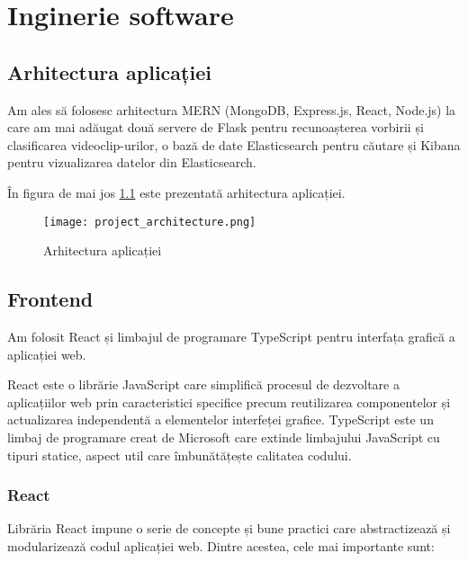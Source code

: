 \chapter{Inginerie software}

\section{Arhitectura aplicației}
Am ales să folosesc arhitectura MERN (MongoDB, Express.js, React, Node.js) la care am mai adăugat
două servere de Flask pentru recunoașterea vorbirii și clasificarea videoclip-urilor, o bază de
date Elasticsearch pentru căutare și Kibana pentru vizualizarea datelor din Elasticsearch.
\par
În figura de mai jos \ref{fig:project-architecture} este prezentată arhitectura aplicației.

\begin{figure}[h]
    \centering
    \texttt{[image: project\_architecture.png]}
    \caption{Arhitectura aplicației}
    \label{fig:project-architecture}
\end{figure}


\section{Frontend}
Am folosit React și limbajul de programare TypeScript pentru interfața grafică a aplicației web. 
\par
React este o librărie JavaScript care simplifică procesul de dezvoltare a aplicațiilor web prin 
caracteristici specifice precum reutilizarea componentelor și actualizarea independentă a
elementelor interfeței grafice. TypeScript este un limbaj de programare creat de Microsoft care
extinde limbajului JavaScript cu tipuri statice, aspect util care îmbunătățește calitatea codului.

\subsection{React}
Librăria React impune o serie de concepte și bune practici care abstractizează și modularizează
codul aplicației web. Dintre acestea, cele mai importante sunt:

